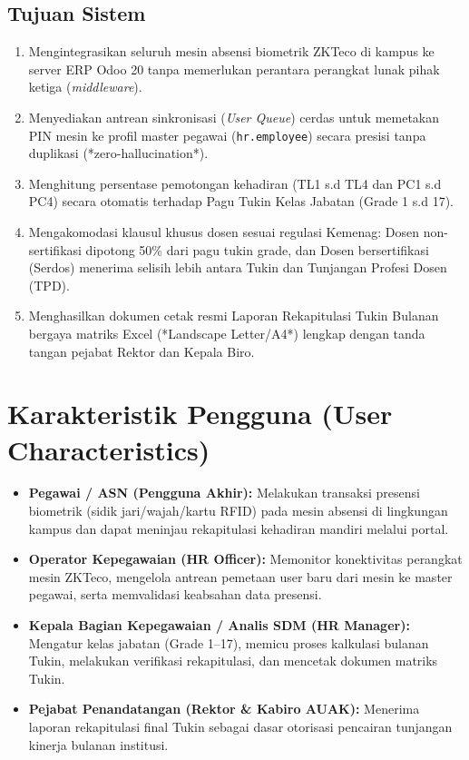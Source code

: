 \documentclass[12pt,a4paper]{article}
\begin{document}
\subsection{Tujuan Sistem}
\begin{enumerate}
    \item Mengintegrasikan seluruh mesin absensi biometrik ZKTeco di kampus ke server ERP Odoo 20 tanpa memerlukan perantara perangkat lunak pihak ketiga (\textit{middleware}).
    \item Menyediakan antrean sinkronisasi (\textit{User Queue}) cerdas untuk memetakan PIN mesin ke profil master pegawai (\texttt{hr.employee}) secara presisi tanpa duplikasi (*zero-hallucination*).
    \item Menghitung persentase pemotongan kehadiran (TL1 s.d TL4 dan PC1 s.d PC4) secara otomatis terhadap Pagu Tukin Kelas Jabatan (Grade 1 s.d 17).
    \item Mengakomodasi klausul khusus dosen sesuai regulasi Kemenag: Dosen non-sertifikasi dipotong 50\% dari pagu tukin grade, dan Dosen bersertifikasi (Serdos) menerima selisih lebih antara Tukin dan Tunjangan Profesi Dosen (TPD).
    \item Menghasilkan dokumen cetak resmi Laporan Rekapitulasi Tukin Bulanan bergaya matriks Excel (*Landscape Letter/A4*) lengkap dengan tanda tangan pejabat Rektor dan Kepala Biro.
\end{enumerate}

\section{Karakteristik Pengguna (User Characteristics)}
\begin{itemize}
    \item \textbf{Pegawai / ASN (Pengguna Akhir):} Melakukan transaksi presensi biometrik (sidik jari/wajah/kartu RFID) pada mesin absensi di lingkungan kampus dan dapat meninjau rekapitulasi kehadiran mandiri melalui portal.
    \item \textbf{Operator Kepegawaian (HR Officer):} Memonitor konektivitas perangkat mesin ZKTeco, mengelola antrean pemetaan user baru dari mesin ke master pegawai, serta memvalidasi keabsahan data presensi.
    \item \textbf{Kepala Bagian Kepegawaian / Analis SDM (HR Manager):} Mengatur kelas jabatan (Grade 1--17), memicu proses kalkulasi bulanan Tukin, melakukan verifikasi rekapitulasi, dan mencetak dokumen matriks Tukin.
    \item \textbf{Pejabat Penandatangan (Rektor \& Kabiro AUAK):} Menerima laporan rekapitulasi final Tukin sebagai dasar otorisasi pencairan tunjangan kinerja bulanan institusi.
\end{itemize}
\end{document}
